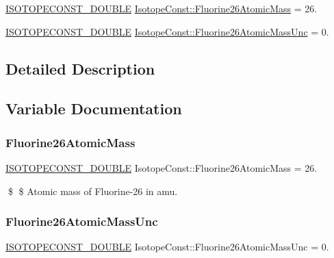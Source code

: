 \begin{DoxyCompactItemize}
\item 
\mbox{\hyperlink{group___isotope_const-_macros_ga8f45a7272ce02c0b4c65c44636ed719a}{I\+S\+O\+T\+O\+P\+E\+C\+O\+N\+S\+T\+\_\+\+D\+O\+U\+B\+LE}} \mbox{\hyperlink{group___isotope_const-_fluorine-_f26_ga9a3fa4004d958814f953b3669033cf48}{Isotope\+Const\+::\+Fluorine26\+Atomic\+Mass}} = 26.
\item 
\mbox{\hyperlink{group___isotope_const-_macros_ga8f45a7272ce02c0b4c65c44636ed719a}{I\+S\+O\+T\+O\+P\+E\+C\+O\+N\+S\+T\+\_\+\+D\+O\+U\+B\+LE}} \mbox{\hyperlink{group___isotope_const-_fluorine-_f26_ga0fe0ced30f6d96cd60dab6a9c89ea467}{Isotope\+Const\+::\+Fluorine26\+Atomic\+Mass\+Unc}} = 0.
\end{DoxyCompactItemize}


\subsection{Detailed Description}


\subsection{Variable Documentation}
\mbox{\label{group___isotope_const-_fluorine-_f26_ga9a3fa4004d958814f953b3669033cf48}} 
\subsubsection{\texorpdfstring{Fluorine26\+Atomic\+Mass}{Fluorine26AtomicMass}}
{\footnotesize\ttfamily \mbox{\hyperlink{group___isotope_const-_macros_ga8f45a7272ce02c0b4c65c44636ed719a}{I\+S\+O\+T\+O\+P\+E\+C\+O\+N\+S\+T\+\_\+\+D\+O\+U\+B\+LE}} Isotope\+Const\+::\+Fluorine26\+Atomic\+Mass = 26.}

\$ \$ Atomic mass of Fluorine-\/26 in amu. \mbox{\label{group___isotope_const-_fluorine-_f26_ga0fe0ced30f6d96cd60dab6a9c89ea467}} 
\subsubsection{\texorpdfstring{Fluorine26\+Atomic\+Mass\+Unc}{Fluorine26AtomicMassUnc}}
{\footnotesize\ttfamily \mbox{\hyperlink{group___isotope_const-_macros_ga8f45a7272ce02c0b4c65c44636ed719a}{I\+S\+O\+T\+O\+P\+E\+C\+O\+N\+S\+T\+\_\+\+D\+O\+U\+B\+LE}} Isotope\+Const\+::\+Fluorine26\+Atomic\+Mass\+Unc = 0.}

